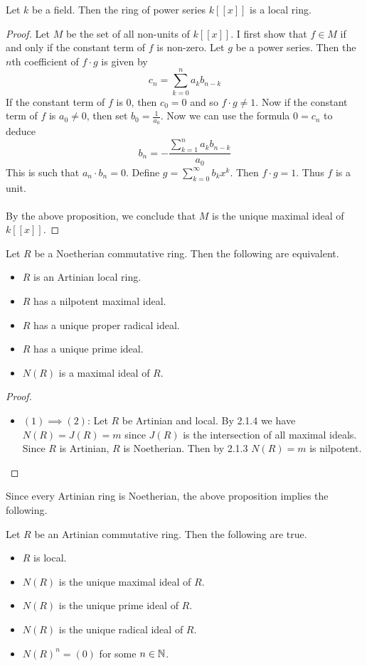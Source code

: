 \documentclass[a4paper]{article}
\begin{document}
\begin{eg}{}{} Let $k$ be a field. Then the ring of power series $k[[x]]$ is a local ring. \tcbline
\begin{proof}
Let $M$ be the set of all non-units of $k[[x]]$. I first show that $f\in M$ if and only if the constant term of $f$ is non-zero. Let $g$ be a power series. Then the $n$th coefficient of $f\cdot g$ is given by $$c_n=\sum_{k=0}^na_kb_{n-k}$$ If the constant term of $f$ is $0$, then $c_0=0$ and so $f\cdot g\neq 1$. Now if the constant term of $f$ is $a_0\neq 0$, then set $b_0=\frac{1}{a_0}$. Now we can use the formula $0=c_n$ to deduce $$b_n=-\frac{\sum_{k=1}^na_kb_{n-k}}{a_0}$$ This is such that $a_n\cdot b_n=0$. Define $g=\sum_{k=0}^\infty b_kx^k$. Then $f\cdot g=1$. Thus $f$ is a unit. \\~\\

By the above proposition, we conclude that $M$ is the unique maximal ideal of $k[[x]]$. 
\end{proof}
\end{eg}

\begin{prp}{}{} Let $R$ be a Noetherian commutative ring. Then the following are equivalent. 
\begin{itemize}
\item $R$ is an Artinian local ring. 
\item $R$ has a nilpotent maximal ideal. 
\item $R$ has a unique proper radical ideal. 
\item $R$ has a unique prime ideal. 
\item $N(R)$ is a maximal ideal of $R$. 
\end{itemize} \tcbline
\begin{proof}~\\
\begin{itemize}
\item $(1)\implies(2)$: Let $R$ be Artinian and local. By 2.1.4 we have $N(R)=J(R)=m$ since $J(R)$ is the intersection of all maximal ideals. Since $R$ is Artinian, $R$ is Noetherian. Then by 2.1.3 $N(R)=m$ is nilpotent. 
\end{itemize}
\end{proof}
\end{prp}

Since every Artinian ring is Noetherian, the above proposition implies the following. 

\begin{crl}{}{} Let $R$ be an Artinian commutative ring. Then the following are true. 
\begin{itemize}
\item $R$ is local. 
\item $N(R)$ is the unique maximal ideal of $R$. 
\item $N(R)$ is the unique prime ideal of $R$. 
\item $N(R)$ is the unique radical ideal of $R$. 
\item $N(R)^n=(0)$ for some $n\in\mathbb{N}$. 
\end{itemize}
\end{crl}
\end{document}
